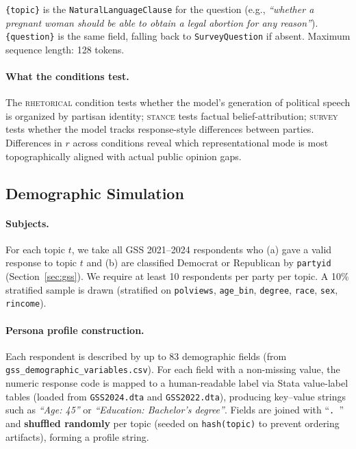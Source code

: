 \documentclass[12pt]{article}
\begin{document}
\noindent\texttt{\{topic\}} is the \texttt{NaturalLanguageClause} for the question (e.g., \textit{``whether a pregnant woman should be able to obtain a legal abortion for any reason''}). \texttt{\{question\}} is the same field, falling back to \texttt{SurveyQuestion} if absent. Maximum sequence length: 128 tokens.

\paragraph{What the conditions test.}
The \textsc{rhetorical} condition tests whether the model's generation of political speech is organized by partisan identity; \textsc{stance} tests factual belief-attribution; \textsc{survey} tests whether the model tracks response-style differences between parties. Differences in $r$ across conditions reveal which representational mode is most topographically aligned with actual public opinion gaps.

\subsection{Demographic Simulation}
\label{sec:demo}

\paragraph{Subjects.}
For each topic $t$, we take all GSS 2021--2024 respondents who (a) gave a valid response to topic $t$ and (b) are classified Democrat or Republican by \texttt{partyid} (Section~\ref{sec:gss}). We require at least 10 respondents per party per topic. A 10\% stratified sample is drawn (stratified on \texttt{polviews}, \texttt{age\_bin}, \texttt{degree}, \texttt{race}, \texttt{sex}, \texttt{rincome}).

\paragraph{Persona profile construction.}
Each respondent is described by up to 83 demographic fields (from \texttt{gss\_demographic\_variables.csv}). For each field with a non-missing value, the numeric response code is mapped to a human-readable label via Stata value-label tables (loaded from \texttt{GSS2024.dta} and \texttt{GSS2022.dta}), producing key--value strings such as \textit{``Age: 45''} or \textit{``Education: Bachelor's degree''}. Fields are joined with ``\texttt{. }'' and \textbf{shuffled randomly} per topic (seeded on \texttt{hash(topic)} to prevent ordering artifacts), forming a profile string.
\end{document}
